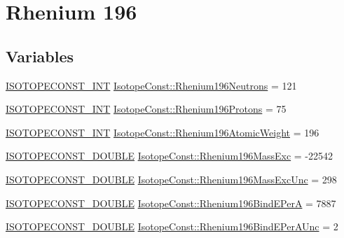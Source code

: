 \hypertarget{group___isotope_const-_rhenium-_re196}{}\section{Rhenium 196}
\label{group___isotope_const-_rhenium-_re196}
\subsection*{Variables}
\begin{DoxyCompactItemize}
\item 
\mbox{\hyperlink{group___isotope_const-_macros_ga5f18360b3e99483a35c32d789e62621c}{I\+S\+O\+T\+O\+P\+E\+C\+O\+N\+S\+T\+\_\+\+I\+NT}} \mbox{\hyperlink{group___isotope_const-_rhenium-_re196_ga1704834322d4c07117245a48f00a1d4f}{Isotope\+Const\+::\+Rhenium196\+Neutrons}} = 121
\item 
\mbox{\hyperlink{group___isotope_const-_macros_ga5f18360b3e99483a35c32d789e62621c}{I\+S\+O\+T\+O\+P\+E\+C\+O\+N\+S\+T\+\_\+\+I\+NT}} \mbox{\hyperlink{group___isotope_const-_rhenium-_re196_ga2de99aae8e162544e072fd8a0ebff1d1}{Isotope\+Const\+::\+Rhenium196\+Protons}} = 75
\item 
\mbox{\hyperlink{group___isotope_const-_macros_ga5f18360b3e99483a35c32d789e62621c}{I\+S\+O\+T\+O\+P\+E\+C\+O\+N\+S\+T\+\_\+\+I\+NT}} \mbox{\hyperlink{group___isotope_const-_rhenium-_re196_gaad036876905fa3db10577fc822dfd83c}{Isotope\+Const\+::\+Rhenium196\+Atomic\+Weight}} = 196
\item 
\mbox{\hyperlink{group___isotope_const-_macros_ga8f45a7272ce02c0b4c65c44636ed719a}{I\+S\+O\+T\+O\+P\+E\+C\+O\+N\+S\+T\+\_\+\+D\+O\+U\+B\+LE}} \mbox{\hyperlink{group___isotope_const-_rhenium-_re196_ga4dc6d123f5ad3129cd49001808fe42a8}{Isotope\+Const\+::\+Rhenium196\+Mass\+Exc}} = -\/22542
\item 
\mbox{\hyperlink{group___isotope_const-_macros_ga8f45a7272ce02c0b4c65c44636ed719a}{I\+S\+O\+T\+O\+P\+E\+C\+O\+N\+S\+T\+\_\+\+D\+O\+U\+B\+LE}} \mbox{\hyperlink{group___isotope_const-_rhenium-_re196_gab9aa508ccb7fe2c43fda1916d924012a}{Isotope\+Const\+::\+Rhenium196\+Mass\+Exc\+Unc}} = 298
\item 
\mbox{\hyperlink{group___isotope_const-_macros_ga8f45a7272ce02c0b4c65c44636ed719a}{I\+S\+O\+T\+O\+P\+E\+C\+O\+N\+S\+T\+\_\+\+D\+O\+U\+B\+LE}} \mbox{\hyperlink{group___isotope_const-_rhenium-_re196_gabe5afb1b6e2c3e7144c08468b0794fbe}{Isotope\+Const\+::\+Rhenium196\+Bind\+E\+PerA}} = 7887
\item 
\mbox{\hyperlink{group___isotope_const-_macros_ga8f45a7272ce02c0b4c65c44636ed719a}{I\+S\+O\+T\+O\+P\+E\+C\+O\+N\+S\+T\+\_\+\+D\+O\+U\+B\+LE}} \mbox{\hyperlink{group___isotope_const-_rhenium-_re196_gadd0ad17b93ad969ad83a12c6a1cbef53}{Isotope\+Const\+::\+Rhenium196\+Bind\+E\+Per\+A\+Unc}} = 2

\end{DoxyCompactItemize}
